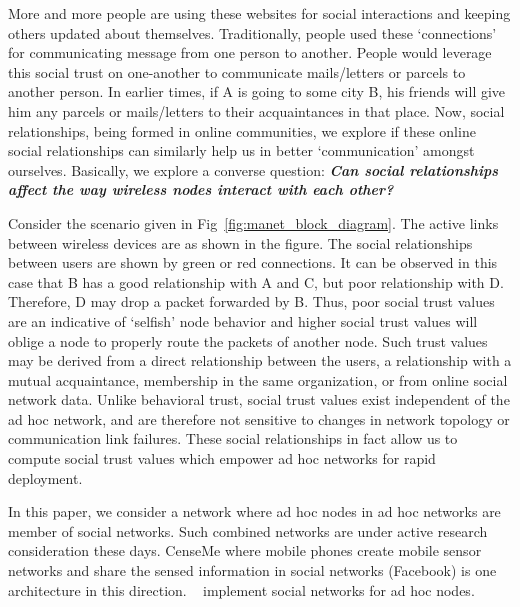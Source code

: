 \documentclass[conference]{IEEEtran}
\begin{document}
More and more people are using these websites for social interactions and keeping others updated about themselves. Traditionally, people used these `connections' for communicating message from one person to another. People would leverage this social trust on one-another to communicate mails/letters or parcels to another person. In earlier times, if A is going to some city B, his friends will give him any parcels or mails/letters to their acquaintances in that place. Now, social relationships, being formed in online communities, we explore if these online social relationships can similarly help us in better `communication' amongst ourselves.
Basically, we explore a converse question: \textbf{\textit{Can social relationships affect the way wireless nodes interact with each other?}}

Consider the scenario given in Fig~\ref{fig:manet_block_diagram}. The active links between wireless devices are as shown in the figure. The social relationships between users are shown by green or red connections. It can be observed in this case that B has a good relationship with A and C, but poor relationship with D. Therefore,  D may drop a packet forwarded by B. Thus, poor social trust values are an indicative of `selfish' node behavior and higher social trust values will oblige a node to properly route the packets of another node. Such trust values may be derived from a direct relationship between the users, a relationship with a mutual acquaintance, membership in the same organization, or from online social network data. Unlike behavioral trust, social trust values exist independent of the ad hoc network, and are therefore not sensitive to changes in network topology or communication link failures. These social relationships in fact allow us to compute social trust values which empower ad hoc networks for rapid deployment.

In this paper, we consider a network where ad hoc nodes in ad hoc networks are member of social networks. Such combined networks are under active research consideration these days. CenseMe where mobile phones create mobile sensor networks and share the sensed information in social networks (Facebook) is one architecture in this direction. ~\cite{li09mobisn,sarigöl09,gurecki09} implement social networks for ad hoc nodes.
\end{document}
